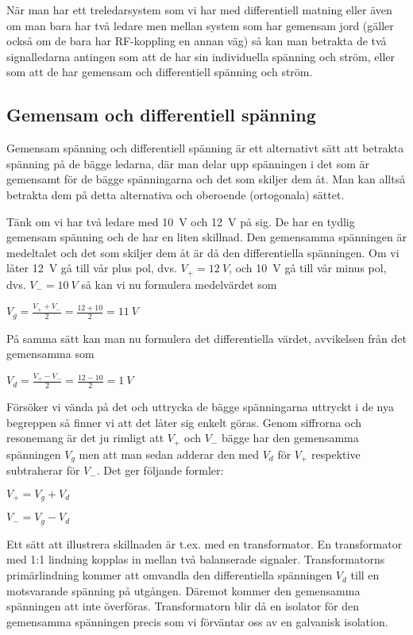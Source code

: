 När man har ett treledarsystem som vi har med differentiell matning eller
även om man bara har två ledare men mellan system som har gemensam jord
(gäller också om de bara har RF-koppling en annan väg) så kan man betrakta
de två signalledarna antingen som att de har sin individuella spänning och
ström, eller som att de har gemensam och differentiell spänning och ström.

\subsection{Gemensam och differentiell spänning}
\label{comdiffv}

Gemensam spänning och differentiell spänning är ett alternativt sätt att
betrakta spänning på de bägge ledarna, där man delar upp spänningen i det som
är gemensamt för de bägge spänningarna och det som skiljer dem åt. Man kan
alltså betrakta dem på detta alternativa och oberoende (ortogonala) sättet.

Tänk om vi har två ledare med 10~V och 12~V på sig. De har en tydlig gemensam
spänning och de har en liten skillnad. Den gemensamma spänningen är medeltalet
och det som skiljer dem åt är då den differentiella spänningen. Om vi låter
12~V gå till vår plus pol, dvs. \(V_+ = 12\ V\), och 10~V gå till vår minus pol,
dvs. \(V_- = 10\ V\) så kan vi nu formulera medelvärdet som

\(V_g = \frac{V_+ + V_-}{2} = \frac{12+10}{2} = 11\ V\)

På samma sätt kan man nu formulera det differentiella värdet, avvikelsen från
det gemensamma som

\(V_d = \frac{V_+ - V_-}{2} = \frac{12-10}{2} = 1\ V\)

Försöker vi vända på det och uttrycka de bägge spänningarna uttryckt i de nya
begreppen så finner vi att det låter sig enkelt göras. Genom siffrorna och
resonemang är det ju rimligt att \(V_+\) och \(V_-\) bägge har den gemensamma
spänningen \(V_g\) men att man sedan adderar den med \(V_d\) för \(V_+\)
respektive subtraherar för \(V_-\). Det ger följande formler:

\(V_+ = V_g + V_d\)

\(V_- = V_g - V_d\)

Ett sätt att illustrera skillnaden är t.ex. med en transformator.
En transformator med 1:1 lindning kopplas in mellan två balanserade signaler.
Transformatorns primärlindning kommer att omvandla den differentiella spänningen
\(V_d\) till en motsvarande spänning på utgången. Däremot kommer den gemensamma
spänningen att inte överföras. Transformatorn blir då en isolator för den
gemensamma spänningen precis som vi förväntar oss av en galvanisk isolation.

